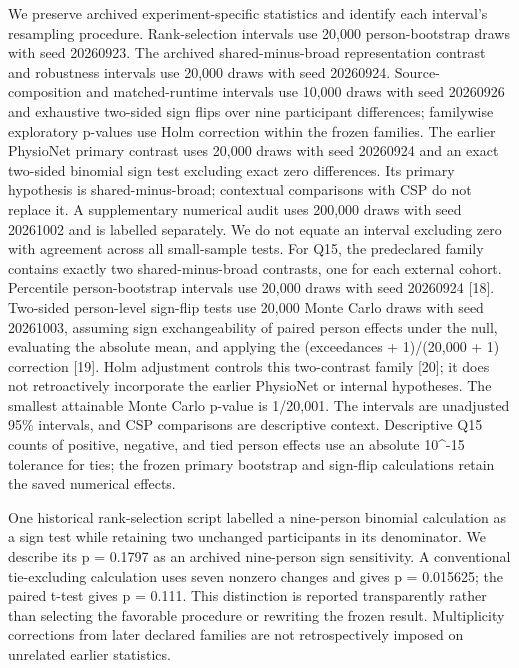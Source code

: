 \documentclass[11pt]{article}
\begin{document}
We preserve archived experiment-specific statistics and identify each interval's resampling procedure. Rank-selection intervals use 20,000 person-bootstrap draws with seed 20260923. The archived shared-minus-broad representation contrast and robustness intervals use 20,000 draws with seed 20260924. Source-composition and matched-runtime intervals use 10,000 draws with seed 20260926 and exhaustive two-sided sign flips over nine participant differences; familywise exploratory p-values use Holm correction within the frozen families. The earlier PhysioNet primary contrast uses 20,000 draws with seed 20260924 and an exact two-sided binomial sign test excluding exact zero differences. Its primary hypothesis is shared-minus-broad; contextual comparisons with CSP do not replace it. A supplementary numerical audit uses 200,000 draws with seed 20261002 and is labelled separately. We do not equate an interval excluding zero with agreement across all small-sample tests. For Q15, the predeclared family contains exactly two shared-minus-broad contrasts, one for each external cohort. Percentile person-bootstrap intervals use 20,000 draws with seed 20260924 [18]. Two-sided person-level sign-flip tests use 20,000 Monte Carlo draws with seed 20261003, assuming sign exchangeability of paired person effects under the null, evaluating the absolute mean, and applying the (exceedances + 1)/(20,000 + 1) correction [19]. Holm adjustment controls this two-contrast family [20]; it does not retroactively incorporate the earlier PhysioNet or internal hypotheses. The smallest attainable Monte Carlo p-value is 1/20,001. The intervals are unadjusted 95\% intervals, and CSP comparisons are descriptive context. Descriptive Q15 counts of positive, negative, and tied person effects use an absolute 10\textasciicircum{}-15 tolerance for ties; the frozen primary bootstrap and sign-flip calculations retain the saved numerical effects.

One historical rank-selection script labelled a nine-person binomial calculation as a sign test while retaining two unchanged participants in its denominator. We describe its p = 0.1797 as an archived nine-person sign sensitivity. A conventional tie-excluding calculation uses seven nonzero changes and gives p = 0.015625; the paired t-test gives p = 0.111. This distinction is reported transparently rather than selecting the favorable procedure or rewriting the frozen result. Multiplicity corrections from later declared families are not retrospectively imposed on unrelated earlier statistics.
\end{document}
